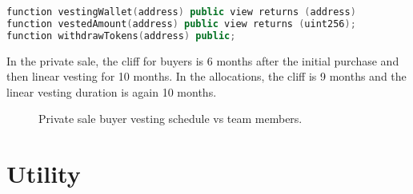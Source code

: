 \documentclass[a4paper,12pt]{article}
\begin{document}
\begin{lstlisting}[language=C++, caption=Solidity vesting function signatures.]
function vestingWallet(address) public view returns (address)
function vestedAmount(address) public view returns (uint256);
function withdrawTokens(address) public;
\end{lstlisting}

In the private sale, the cliff for buyers is 6 months after the initial purchase and then linear vesting for 10 months. In the allocations, the cliff is 9 months and the linear vesting duration is again 10 months.
\begin{figure}[h!]
\centering
{}
\caption{Private sale buyer vesting schedule vs team members.}
\end{figure}


\section{Utility}
\end{document}
